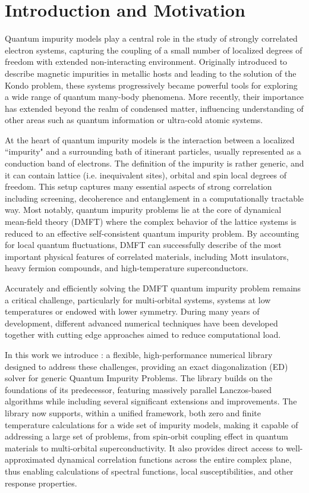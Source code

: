 \documentclass[edipack_sp.tex]{subfiles}
\begin{document}
\section{Introduction and Motivation}\label{SecIntro}


Quantum impurity models play a central role in the study of strongly correlated electron systems, capturing the coupling of a small number of localized degrees of freedom with extended non-interacting environment.   
Originally introduced to describe magnetic impurities in metallic hosts and leading to the solution of the Kondo problem, these systems progressively became powerful tools for exploring a wide range of quantum many-body phenomena. More recently, their importance has extended beyond the realm of condensed matter, influencing understanding of other areas such as quantum information or ultra-cold atomic systems. 

At the heart of quantum impurity models is the interaction between a localized ``impurity"  and a surrounding bath of itinerant particles, usually represented as a conduction band of electrons. The definition of the impurity is rather generic, and it can contain lattice (i.e. inequivalent sites), orbital and spin local degrees of freedom.
This setup captures many essential aspects of strong correlation including screening, decoherence and entanglement in a computationally tractable way. 
Most notably, quantum impurity problems lie at the core of dynamical mean-field theory (DMFT) where the complex behavior of the lattice systems is reduced to an effective self-consistent quantum impurity problem.  
By accounting for local quantum fluctuations, DMFT can successfully describe of the most important physical features of correlated materials, including Mott insulators, heavy fermion compounds, and high-temperature superconductors.  

Accurately and efficiently solving the DMFT quantum impurity problem remains a
critical challenge, particularly for multi-orbital systems, systems
at low temperatures or endowed with lower symmetry. During many years of development, different advanced numerical techniques have been developed together with cutting edge approaches aimed to reduce computational load.  

In this work we introduce  \NAME{}: a flexible, high-performance numerical library designed to address these challenges, providing an exact diagonalization (ED) solver for generic Quantum Impurity Problems. 
The library builds on the foundations of
its predecessor, featuring massively parallel Lanczos-based algorithms while including several significant extensions and 
improvements. The library now supports, within a unified framework, both zero and finite temperature calculations for a wide set of impurity models, making it capable of addressing a large set of problems, from spin-orbit coupling effect in quantum materials to multi-orbital superconductivity. It also provides direct
access to well-approximated dynamical correlation functions across the
entire complex plane, thus enabling calculations of spectral functions, local susceptibilities, and other response properties.
\end{document}
